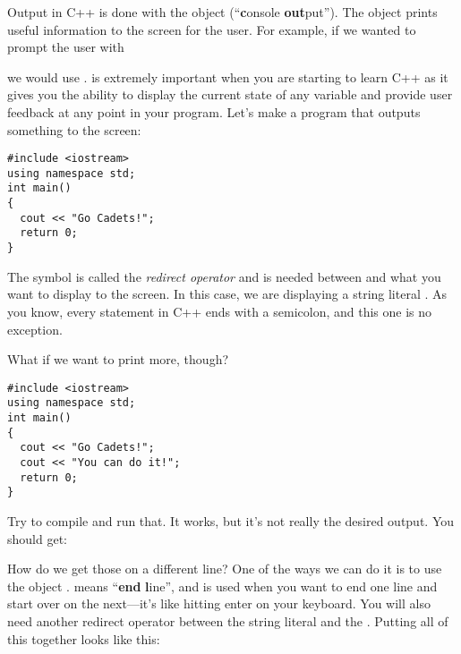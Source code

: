 Output in C++ is done with the object  (``\textbf{c}onsole \textbf{out}put''). 
The object  prints useful information to the screen for the user. 
For example, if we wanted to prompt the user with 

\noindent {}

\noindent we would use . 
 is extremely important when you are starting to learn C++ as it gives you the ability to display the current state of any variable and provide user feedback at any point in your program. 
Let's make a program that outputs something to the screen:

\noindent\begin{minipage}{\linewidth}\begin{lstlisting}
#include <iostream>
using namespace std;
int main()
{
  cout << "Go Cadets!";
  return 0;
}
\end{lstlisting}\end{minipage}


The symbol \Code{<<} is called the \emph{redirect operator} and is needed between  and what you want to display to the screen. 
In this case, we are displaying a string literal . 
As you know, every statement in C++ ends with a semicolon, and this one is no exception.

What if we want to print more, though?

\noindent\begin{minipage}{\linewidth}\begin{lstlisting}
#include <iostream>
using namespace std;
int main()
{
  cout << "Go Cadets!";
  cout << "You can do it!";
  return 0;
}
\end{lstlisting}\end{minipage}

Try to compile and run that. 
It works, but it's not really the desired output. 
You should get:

\noindent {}

How do we get those on a different line? 
One of the ways we can do it is to use the object . 
 means ``\textbf{end} \textbf{l}ine'', and is used when you want to end one line and start over on the next---it's like hitting enter on your keyboard. 
You will also need another redirect operator between the string literal and the . 
Putting all of this together looks like this:

